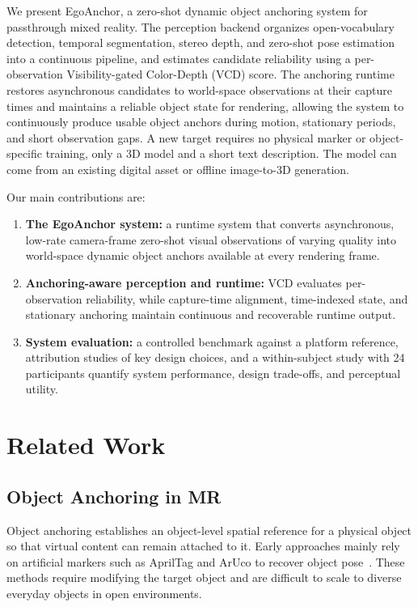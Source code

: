\documentclass[review]{vgtc}
\begin{document}
We present EgoAnchor, a zero-shot dynamic object anchoring system for passthrough mixed reality. The perception backend organizes open-vocabulary detection, temporal segmentation, stereo depth, and zero-shot pose estimation into a continuous pipeline, and estimates candidate reliability using a per-observation Visibility-gated Color-Depth (VCD) score. The anchoring runtime restores asynchronous candidates to world-space observations at their capture times and maintains a reliable object state for rendering, allowing the system to continuously produce usable object anchors during motion, stationary periods, and short observation gaps. A new target requires no physical marker or object-specific training, only a 3D model and a short text description. The model can come from an existing digital asset or offline image-to-3D generation.

Our main contributions are:
\begin{enumerate}[leftmargin=1.8em,itemsep=1pt,topsep=2pt]
  \item \textbf{The EgoAnchor system:} a runtime system that converts asynchronous, low-rate camera-frame zero-shot visual observations of varying quality into world-space dynamic object anchors available at every rendering frame.
  \item \textbf{Anchoring-aware perception and runtime:} VCD evaluates per-observation reliability, while capture-time alignment, time-indexed state, and stationary anchoring maintain continuous and recoverable runtime output.
  \item \textbf{System evaluation:} a controlled benchmark against a platform reference, attribution studies of key design choices, and a within-subject study with 24 participants quantify system performance, design trade-offs, and perceptual utility.
\end{enumerate}

\section{Related Work}\label{sec:related-work}

\subsection{Object Anchoring in MR}

Object anchoring establishes an object-level spatial reference for a physical object so that virtual content can remain attached to it. Early approaches mainly rely on artificial markers such as AprilTag and ArUco to recover object pose~\cite{apriltag2011,aruco2014}. These methods require modifying the target object and are difficult to scale to diverse everyday objects in open environments.
\end{document}
